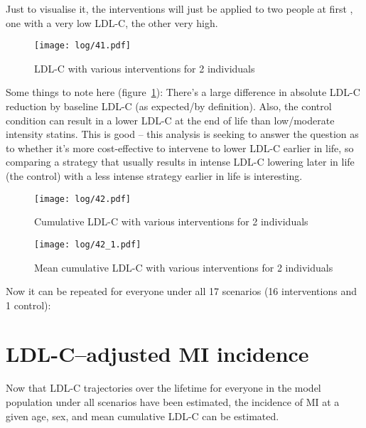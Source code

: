 \documentclass[11pt]{article}
\begin{document}
Just to visualise it, the interventions will just be applied to two people at first
, one with a very low LDL-C, the other very high.

\color{Blue4}
\begin{figure}
    \centering
    \texttt{[image: log/41.pdf]}
    \caption{LDL-C with various interventions for 2 individuals}
    \label{LDLwithint}
\end{figure}
\begin{stlog}\end{stlog}
\color{black}
Some things to note here (figure~\ref{LDLwithint}):
There's a large difference in 
absolute LDL-C reduction by baseline LDL-C (as expected/by definition). 
Also, the control condition can result in a lower LDL-C at the end of life than 
low/moderate intensity statins. This is good -- this analysis is seeking
to answer the question as to whether it's more cost-effective to intervene to 
lower LDL-C earlier in life, 
so comparing a strategy that usually results in intense LDL-C lowering later in life
(the control) with a less intense strategy earlier in life is interesting. 
\color{Blue4}
\begin{figure}
    \centering
    \texttt{[image: log/42.pdf]}
    \caption{Cumulative LDL-C with various interventions for 2 individuals}
    \label{cumLDLwithint}
\end{figure}
\begin{figure}
    \centering
    \texttt{[image: log/42\_1.pdf]}
    \caption{Mean cumulative LDL-C with various interventions for 2 individuals}
    \label{aveLDLwithint}
\end{figure}
\begin{stlog}\end{stlog}
\color{black}
Now it can be repeated for everyone under all 17 scenarios (16 interventions and 1 control):
\color{Blue4}
\begin{stlog}\end{stlog}
\color{black}

\clearpage
\pagebreak
\section{LDL-C--adjusted MI incidence}
\label{LDLAMI}

Now that LDL-C trajectories over the lifetime for everyone in the model population under all scenarios 
have been estimated, the incidence of MI at a given age, sex, and mean cumulative LDL-C can be estimated.
\end{document}
